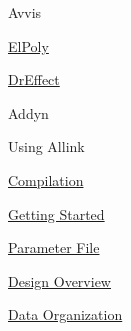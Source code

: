\begin{DoxyItemize}
\item \-Avvis  
\item \hyperlink{ElPoly_page}{\-El\-Poly}  
\item \hyperlink{DrEffect_page}{\-Dr\-Effect}  
\item \-Addyn  
\end{DoxyItemize}\-Using \-Allink 
\begin{DoxyItemize}
\item \hyperlink{compile_page}{\-Compilation}  
\item \hyperlink{usage_page}{\-Getting \-Started}  
\item \hyperlink{param_page}{\-Parameter \-File} 
\item \hyperlink{design_page}{\-Design \-Overview}  
\end{DoxyItemize}\hyperlink{data_page}{\-Data \-Organization}   
